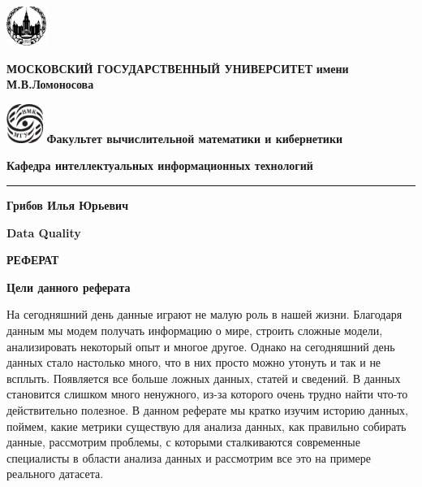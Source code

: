 \documentclass{article}
\begin{document}
\begin{titlepage}
	\begin{center}
	\includegraphics[height=0.5in]{msu.png}
	\hfill
	\begin{minipage}[b]{0.77\textwidth}
		\centering
		\textbf{\fontsize{12}{9}\selectfont МОСКОВСКИЙ ГОСУДАРСТВЕННЫЙ УНИВЕРСИТЕТ}
		\bigbreak
		\textbf{\fontsize{12}{9}\selectfont имени М.В.Ломоносова}
	\end{minipage}
	\hfill
	\includegraphics[height=0.5in]{vmk.png}
	\bigbreak
	\textbf{\fontsize{12}{9}\selectfont Факультет вычислительной       математики и кибернетики}
        \begin{center}
            \textbf{\fontsize{14}{9}\selectfont Кафедра интеллектуальных информационных технологий}
        \end{center}
	\end{center}
	\vspace{-0.1cm}
	\hrule
	
	\vspace{5cm}
	\begin{center}
	{\fontsize{16}{20}\selectfont\bf
            Грибов Илья Юрьевич
	}

        \vspace{2cm}
        
	{\fontsize{17}{30}\selectfont\bf
            \textbf{Data Quality}
	}
				
	\vspace{2cm}
	
	{\fontsize{16}{30}\selectfont 
	\textbf{РЕФЕРАТ}}
	\end{center}
	
	\vfill
\end{titlepage}

\tableofcontents

\newpage

{\Large\textbf{Цели данного реферата}}

\vspace{0.5cm}
На сегодняшний день данные играют не малую роль в нашей жизни. Благодаря данным мы модем получать информацию о мире, строить сложные модели, анализировать некоторый опыт и многое другое. Однако на сегодняшний день данных стало настолько много, что в них просто можно утонуть и так и не всплыть. Появляется все больше ложных данных, статей и сведений. В данных становится слишком много ненужного, из-за которого очень трудно найти что-то действительно полезное. В данном реферате мы кратко изучим историю данных, поймем, какие метрики существую для анализа данных, как правильно собирать данные, рассмотрим проблемы, с которыми сталкиваются современные специалисты в области анализа данных и рассмотрим все это на примере реального датасета.
\end{document}
